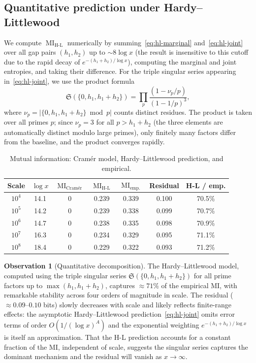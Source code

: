 \documentclass[11pt, a4paper]{amsart}
\theoremstyle{plain}
\theoremstyle{definition}
\newtheorem{observation}[theorem]{Observation}
\newcommand{\MI}{\operatorname{MI}}
\newcommand{\fS}{\mathfrak{S}}
\begin{document}
\subsection{Quantitative prediction under Hardy--Littlewood}

We compute $\MI_{\text{H-L}}$ numerically by summing~\eqref{eq:hl-marginal} and~\eqref{eq:hl-joint} over all gap pairs $(h_1, h_2)$ up to $\sim 8 \log x$ (the result is insensitive to this cutoff due to the rapid decay of $e^{-(h_1+h_2)/\log x}$), computing the marginal and joint entropies, and taking their difference.
For the triple singular series appearing in~\eqref{eq:hl-joint}, we use the product formula
\[
\fS(\{0, h_1, h_1 + h_2\}) = \prod_{p} \frac{(1 - \nu_p / p)}{(1 - 1/p)^3},
\]
where $\nu_p = |\{0, h_1, h_1 + h_2\} \bmod p|$ counts distinct residues.
The product is taken over all primes $p$; since $\nu_p = 3$ for all $p > h_1 + h_2$ (the three elements are automatically distinct modulo large primes), only finitely many factors differ from the baseline, and the product converges rapidly.

\begin{table}[ht]
\centering
\caption{Mutual information: Cram\'er model, Hardy--Littlewood prediction, and empirical.}
\label{tab:cramer-mi}
\begin{tabular}{ccccccc}
\toprule
Scale & $\log x$ & $\MI_{\text{Cram\'er}}$ & $\MI_{\text{H-L}}$ & $\MI_{\text{emp.}}$ & Residual & H-L / emp. \\
\midrule
$10^4$  & 14.1 & 0 & 0.239 & 0.339 & 0.100 & 70.5\% \\
$10^5$  & 14.2 & 0 & 0.239 & 0.338 & 0.099 & 70.7\% \\
$10^6$  & 14.7 & 0 & 0.238 & 0.335 & 0.098 & 70.9\% \\
$10^7$  & 16.3 & 0 & 0.234 & 0.329 & 0.095 & 71.1\% \\
$10^8$  & 18.4 & 0 & 0.229 & 0.322 & 0.093 & 71.2\% \\
\bottomrule
\end{tabular}
\end{table}

\begin{observation}[Quantitative decomposition]
The Hardy--Littlewood model, computed using the triple singular series $\fS(\{0, h_1, h_1 + h_2\})$ for all prime factors up to $\max(h_1, h_1+h_2)$, captures $\approx 71\%$ of the empirical MI, with remarkable stability across four orders of magnitude in scale.
The residual ($\approx 0.09$--$0.10$ bits) slowly decreases with scale and likely reflects finite-range effects: the asymptotic Hardy--Littlewood prediction~\eqref{eq:hl-joint} omits error terms of order $O(1/(\log x)^A)$ and the exponential weighting $e^{-(h_1+h_2)/\log x}$ is itself an approximation.
That the H-L prediction accounts for a constant fraction of the MI, independent of scale, suggests the singular series captures the dominant mechanism and the residual will vanish as $x \to \infty$.
\end{observation}
\end{document}
